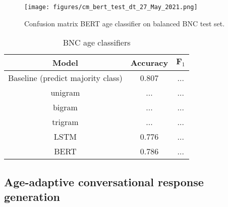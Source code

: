 \begin{figure}[H]
    \centering
    \texttt{[image: figures/cm\_bert\_test\_dt\_27\_May\_2021.png]}
    \caption{Confusion matrix BERT age classifier on balanced BNC test set.}
    \label{fig:cm_bert_bnc_rb}
\end{figure}

\begin{table}[H]
    \centering
    \begin{tabular}{c c c}
    \hline
    \textbf{Model} & \textbf{Accuracy} & $\boldsymbol{F}_1$\\
    \hline
    Baseline (predict majority class) & 0.807 & ...\\
    unigram & ... & ...\\
    bigram & ... & ...\\
    trigram & ... & ...\\
    LSTM & 0.776 & ...\\
    BERT & 0.786 & ...\\
    \hline
    \end{tabular}
    \caption{BNC age classifiers}
    \label{tab:bnc_classification}
\end{table}

\subsection{Age-adaptive conversational response generation}
